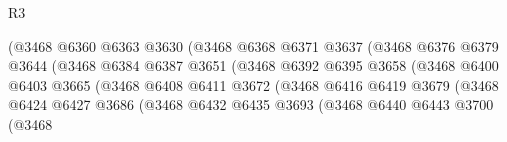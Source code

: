 \begin{lexlean}{R3}
\begin{coremodule}
                                        (@3468
                                          @6360
                                          @6363
                                          @3630
                                          (@3468
                                            @6368
                                            @6371
                                            @3637
                                            (@3468
                                              @6376
                                              @6379
                                              @3644
                                              (@3468
                                                @6384
                                                @6387
                                                @3651
                                                (@3468
                                                  @6392
                                                  @6395
                                                  @3658
                                                  (@3468
                                                    @6400
                                                    @6403
                                                    @3665
                                                    (@3468
                                                      @6408
                                                      @6411
                                                      @3672
                                                      (@3468
                                                        @6416
                                                        @6419
                                                        @3679
                                                        (@3468
                                                          @6424
                                                          @6427
                                                          @3686
                                                          (@3468
                                                            @6432
                                                            @6435
                                                            @3693
                                                            (@3468
                                                              @6440
                                                              @6443
                                                              @3700
                                                              (@3468

\end{coremodule}
\end{lexlean}
